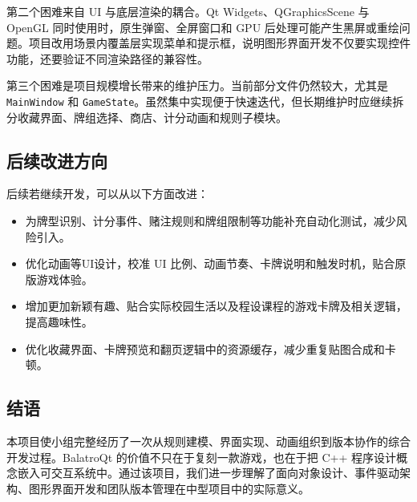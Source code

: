 \documentclass[UTF8,11pt,a4paper]{ctexart}
\newcommand{\code}[1]{\texttt{\small #1}}
\begin{document}
第二个困难来自 UI 与底层渲染的耦合。Qt Widgets、QGraphicsScene 与 OpenGL 同时使用时，原生弹窗、全屏窗口和 GPU 后处理可能产生黑屏或重绘问题。项目改用场景内覆盖层实现菜单和提示框，说明图形界面开发不仅要实现控件功能，还要验证不同渲染路径的兼容性。

第三个困难是项目规模增长带来的维护压力。当前部分文件仍然较大，尤其是 \code{MainWindow} 和 \code{GameState}。虽然集中实现便于快速迭代，但长期维护时应继续拆分收藏界面、牌组选择、商店、计分动画和规则子模块。

\subsection{后续改进方向}

后续若继续开发，可以从以下方面改进：

\begin{itemize}
  \item 为牌型识别、计分事件、赌注规则和牌组限制等功能补充自动化测试，减少风险引入。
  \item 优化动画等UI设计，校准 UI 比例、动画节奏、卡牌说明和触发时机，贴合原版游戏体验。
  \item 增加更加新颖有趣、贴合实际校园生活以及程设课程的游戏卡牌及相关逻辑，提高趣味性。
  \item 优化收藏界面、卡牌预览和翻页逻辑中的资源缓存，减少重复贴图合成和卡顿。
\end{itemize}

\subsection{结语}

本项目使小组完整经历了一次从规则建模、界面实现、动画组织到版本协作的综合开发过程。BalatroQt 的价值不只在于复刻一款游戏，也在于把 C++ 程序设计概念嵌入可交互系统中。通过该项目，我们进一步理解了面向对象设计、事件驱动架构、图形界面开发和团队版本管理在中型项目中的实际意义。
\end{document}
